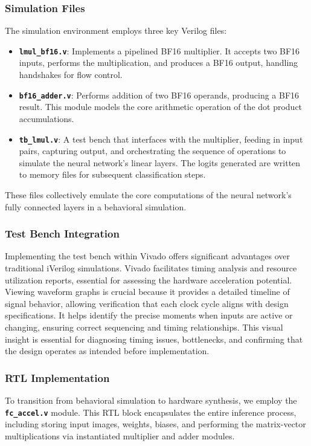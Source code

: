 \documentclass[12pt,letterpaper]{article}
\begin{document}
\subsubsection{Simulation Files}  
The simulation environment employs three key Verilog files:  
\begin{itemize}
    \item \textbf{\texttt{lmul\_bf16.v}}: Implements a pipelined BF16 multiplier. It accepts two BF16 inputs, performs the multiplication, and produces a BF16 output, handling handshakes for flow control.
    \item \textbf{\texttt{bf16\_adder.v}}: Performs addition of two BF16 operands, producing a BF16 result. This module models the core arithmetic operation of the dot product accumulations.
    \item \textbf{\texttt{tb\_lmul.v}}: A test bench that interfaces with the multiplier, feeding in input pairs, capturing output, and orchestrating the sequence of operations to simulate the neural network's linear layers. The logits generated are written to memory files for subsequent classification steps.
\end{itemize}  
These files collectively emulate the core computations of the neural network's fully connected layers in a behavioral simulation.

\subsubsection{Test Bench Integration}  
Implementing the test bench within Vivado offers significant advantages over traditional iVerilog simulations. Vivado facilitates timing analysis and resource utilization reports, essential for assessing the hardware acceleration potential. Viewing waveform graphs is crucial because it provides a detailed timeline of signal behavior, allowing verification that each clock cycle aligns with design specifications. It helps identify the precise moments when inputs are active or changing, ensuring correct sequencing and timing relationships. This visual insight is essential for diagnosing timing issues, bottlenecks, and confirming that the design operates as intended before implementation.

\subsubsection{RTL Implementation}  
To transition from behavioral simulation to hardware synthesis, we employ the \textbf{\texttt{fc\_accel.v}} module. This RTL block encapsulates the entire inference process, including storing input images, weights, biases, and performing the matrix-vector multiplications via instantiated multiplier and adder modules.  
\end{document}
